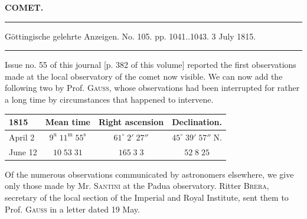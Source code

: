 \clearpage{}\hypertarget{native-390-lower}{}\label{native-390-lower}
\begin{center}\textbf{COMET.}\par\vspace{4pt}\hrule\vspace{4pt}\fontsize{10}{12}\selectfont Göttingische gelehrte Anzeigen. No. 105. pp. 1041..1043. 3 July 1815.\par\vspace{4pt}\hrule\vspace{4pt}\end{center}

\par\indent Issue no. 55 of this journal [p. 382 of this volume] reported the first observations made at the local observatory of the comet now visible. We can now add the following two by Prof. \textsc{Gauss}, whose observations had been interrupted for rather a long time by circumstances that happened to intervene.

\begin{center}\fontsize{10}{12}\selectfont\setlength{\tabcolsep}{4pt}\renewcommand{\arraystretch}{1.15}\begin{tabular}{l|c|c|c}
1815 & Mean time & Right ascension & Declination.\\\hline
April 2 & $9^{\mathrm u}\;11^{\mathrm m}\;55^{\mathrm s}$ & $61^\circ\;2'\;27''$ & $45^\circ\;39'\;57''\;\mathrm{N.}$\\
June 12 & $10\;53\;31$ & $165\;3\;3$ & $52\;8\;25$\\
\end{tabular}\end{center}

\par\indent Of the numerous observations communicated by astronomers elsewhere, we give only those made by Mr. \textsc{Santini} at the Padua observatory. Ritter \textsc{Brera}, secretary of the local section of the Imperial and Royal Institute, sent them to Prof. \textsc{Gauss} in a letter dated 19 May.

